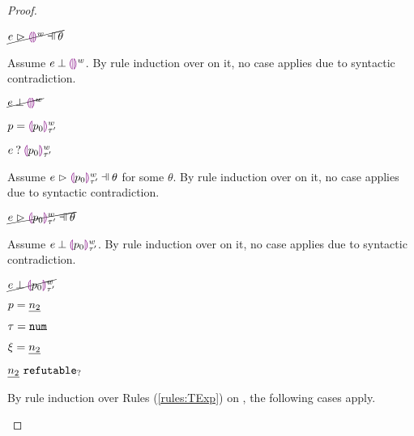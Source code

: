 \begin{proof}
\begin{byCases}
\begin{pfsteps*}
    \item $\cancel{\hpatmatch{e}{\heholep{w}}{\theta}}$ 
    \end{pfsteps*}
    Assume $e \mathbin{\bot} \textcolor{violet}{\llparenthesis}\textcolor{violet}{\rrparenthesis}^{w}$. By rule induction over  on it, no case applies due to syntactic contradiction.
    \begin{pfsteps*}
    \item $\cancel{e \mathbin{\bot} \textcolor{violet}{\llparenthesis}\textcolor{violet}{\rrparenthesis}^{w}}$ 
    \end{pfsteps*}
\item[\text{(\ref{rule:PTHole})}]
    \begin{pfsteps*}
    \item $p=\textcolor{violet}{\llparenthesis} p_0\textcolor{violet}{\rrparenthesis}^{w}_{\tau'}$ 
    \item $e \mathbin{?} \textcolor{violet}{\llparenthesis} p_0\textcolor{violet}{\rrparenthesis}^{w}_{\tau'}$ 
    \end{pfsteps*}
    Assume $\hpatmatch{e}{\hholep{p_0}{w}{\tau'}}{\theta}$ for some $\theta$. By rule induction over  on it, no case applies due to syntactic contradiction.
    \begin{pfsteps*}
    \item $\cancel{\hpatmatch{e}{\hholep{p_0}{w}{\tau'}}{\theta}}$ 
    \end{pfsteps*}
    Assume $e \mathbin{\bot} \textcolor{violet}{\llparenthesis} p_0\textcolor{violet}{\rrparenthesis}^{w}_{\tau'}$. By rule induction over  on it, no case applies due to syntactic contradiction.
    \begin{pfsteps*}
    \item $\cancel{e \mathbin{\bot} \textcolor{violet}{\llparenthesis} p_0\textcolor{violet}{\rrparenthesis}^{w}_{\tau'}}$ 
    \end{pfsteps*}
\item[\text{(\ref{rule:PTNum})}]
    \begin{pfsteps*}
    \item $p=\underline{n_2}$ 
    \item $\tau=\mathtt{num}$ 
    \item $\xi=\underline{n_2}$ 
    \item $\underline{n_2} ~\mathtt{refutable}_?$  
    \end{pfsteps*}
    By rule induction over Rules (\ref{rules:TExp}) on , the following cases apply.
    \begin{byCases}
    \item[\text{(\ref{rule:TEHole}),(\ref{rule:THole}),(\ref{rule:TAp}),(\ref{rule:TFst}),(\ref{rule:TSnd}),(\ref{rule:TMatchZPre}),(\ref{rule:TMatchNZPre})}]

\end{byCases}
\end{byCases}
\end{proof}
